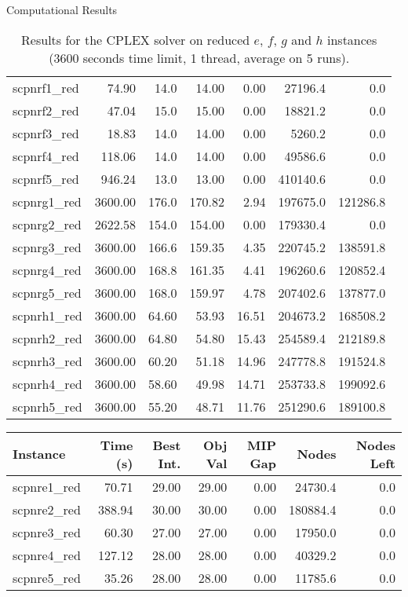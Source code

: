 \documentclass[a4paper,12pt]{mydeitesi_eng}
\begin{document}
\begin{chapter}{Computational Results}
\begin{table}[h]
\begin{center}
\begin{tabular}{l|r|r|r|r|r|r}
scpnrf1\_red & 74.90 & 14.0 & 14.00 & 0.00 & 27196.4 & 0.0 \\ 
scpnrf2\_red & 47.04 & 15.0 & 15.00 & 0.00 & 18821.2 & 0.0 \\ 
scpnrf3\_red & 18.83 & 14.0 & 14.00 & 0.00 & 5260.2 & 0.0 \\ 
scpnrf4\_red & 118.06 & 14.0 & 14.00 & 0.00 & 49586.6 & 0.0 \\ 
scpnrf5\_red & 946.24 & 13.0 & 13.00 & 0.00 & 410140.6 & 0.0 \\ 
\hline

scpnrg1\_red & 3600.00 & 176.0 & 170.82 & 2.94 & 197675.0 & 121286.8 \\ 
scpnrg2\_red & 2622.58 & 154.0 & 154.00 & 0.00 & 179330.4 & 0.0 \\ 
scpnrg3\_red & 3600.00 & 166.6 & 159.35 & 4.35 & 220745.2 & 138591.8 \\ 
scpnrg4\_red & 3600.00 & 168.8 & 161.35 & 4.41 & 196260.6 & 120852.4 \\ 
scpnrg5\_red & 3600.00 & 168.0 & 159.97 & 4.78 & 207402.6 & 137877.0 \\ 
\hline

scpnrh1\_red & 3600.00 & 64.60 & 53.93 & 16.51 & 204673.2 & 168508.2 \\ 
scpnrh2\_red & 3600.00 & 64.80 & 54.80 & 15.43 & 254589.4 & 212189.8 \\ 
scpnrh3\_red & 3600.00 & 60.20 & 51.18 & 14.96 & 247778.8 & 191524.8 \\ 
scpnrh4\_red & 3600.00 & 58.60 & 49.98 & 14.71 & 253733.8 & 199092.6 \\ 
scpnrh5\_red & 3600.00 & 55.20 & 48.71 & 11.76 & 251290.6 & 189100.8 \\ 
\end{tabular}
\end{center}
\caption{Results for the CPLEX solver on reduced $e$, $f$, $g$ and $h$ instances (3600 seconds time limit, 1 thread, average on 5  runs).}
\label{tab:ResultCPLEXDefault}
\end{table}


\begin{table}[h]
\begin{center}
\begin{tabular}{l|r|r|r|r|r|r}
\textbf{Instance} & \textbf{Time (s)} & \textbf{Best Int.} & \textbf{Obj Val} & \textbf{MIP Gap} & \textbf{Nodes} & \textbf{Nodes Left}\\
\hline
scpnre1\_red & 70.71 & 29.00 & 29.00 & 0.00 & 24730.4 & 0.0 \\ 
scpnre2\_red & 388.94 & 30.00 & 30.00 & 0.00 & 180884.4 & 0.0 \\ 
scpnre3\_red & 60.30 & 27.00 & 27.00 & 0.00 & 17950.0 & 0.0 \\ 
scpnre4\_red & 127.12 & 28.00 & 28.00 & 0.00 & 40329.2 & 0.0 \\ 
scpnre5\_red & 35.26 & 28.00 & 28.00 & 0.00 & 11785.6 & 0.0 \\
\hline
 

\end{tabular}
\end{center}
\end{table}
\end{chapter}
\end{document}
